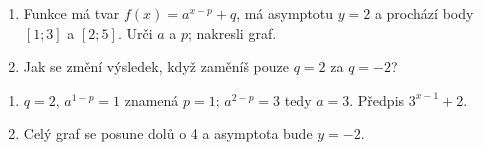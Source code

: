 \documentclass[11pt,a4paper]{article}
\begin{document}
\begin{zadaniReseniBox}[title={Rozšíření 1}]
\begin{enumerate}[label=\alph*)]
\item Funkce má tvar $f(x)=a^{x-p}+q$, má asymptotu $y=2$ a prochází body $[1;3]$ a $[2;5]$. Urči $a$ a $p$; nakresli graf.
\item Jak se změní výsledek, když zaměníš pouze $q=2$ za $q=-2$?
\end{enumerate}
\tcblower
\begin{enumerate}[label=\alph*)]
\item $q=2$, $a^{1-p}=1$ znamená $p=1$; $a^{2-p}=3$ tedy $a=3$. Předpis $3^{x-1}+2$.
\item Celý graf se posune dolů o 4 a asymptota bude $y=-2$.
\end{enumerate}
\end{zadaniReseniBox}
\enlargethispage{1\baselineskip}
\end{document}
